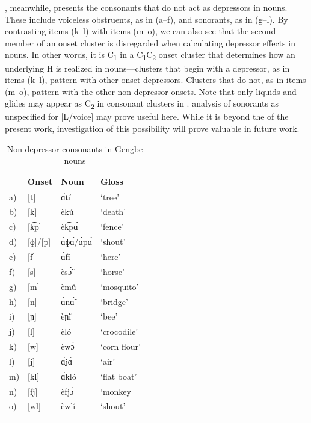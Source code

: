 \documentclass[output=paper,newtxmath,modfonts,nonflat]{langsci/langscibook}
\begin{document}
, meanwhile, presents the consonants that do not act as depressors in  nouns. These include voiceless obstruents, as in (a–f), and sonorants, as in (g–l). By contrasting  items (k–l) with  items (m–o), we can also see that the second member of an onset cluster is disregarded when calculating depressor effects in nouns. In other words, it is C\textsubscript{1} in a C\textsubscript{1}C\textsubscript{2} onset cluster that determines how an underlying H is realized in  nouns—clusters that begin with a depressor, as in  items (k–l), pattern with other onset depressors. Clusters that do not, as in  items (m–o), pattern with the other non-depressor onsets. Note that only liquids and glides may appear as C\textsubscript{2} in consonant clusters in .  analysis of sonorants as unspecified for [L/voice] may prove useful here. While it is beyond the  of the present work, investigation of this possibility will prove valuable in future work.

\begin{table}
\begin{tabularx}{.66\textwidth}{lllX}
\lsptoprule
&  Onset &  Noun &  Gloss\\
\midrule
a) & [t]     & ɑ̀tí  &  {‘tree’}\\
b) & [k]     & èkú  &  {‘death’}\\
c) & [k͡p]    & èk͡pɑ́ &  {‘fence’} \\
d) & [ɸ]/[p] & ɑ̀ɸɑ́/ɑ̀pɑ́ &  {‘shout’}\\
e) & [f]     & ɑ̀fí  &  {‘here’}\\
f) & [s]     & èsɔ̃́  &  {‘horse’}\\
g) & [m]     & èmṹ  &  {‘mosquito’}\\
h) & [n]     & ɑ̀nɑ̃́  &  {‘bridge’}\\
i) & [ɲ]     & èɲĩ́  &  {‘bee’}\\
j) & [l]     & èló  &  {‘crocodile’}\\
k) & [w]     & èwɔ́  &  {‘corn flour’}\\
l) & [j]     & ɑ̀jɑ́  &  {‘air’}\\
m) & [kl]    & ɑ̀kló &  {‘flat boat’}\\
n) & [fj]    & èfjɔ́ &  {‘monkey}\\
o) & [wl]    & èwlí &  {‘shout’}\\
\lspbottomrule
\end{tabularx}
\caption{Non-depressor consonants in Gengbe nouns}
\label{tab:lotven:4}
\end{table}
\end{document}
